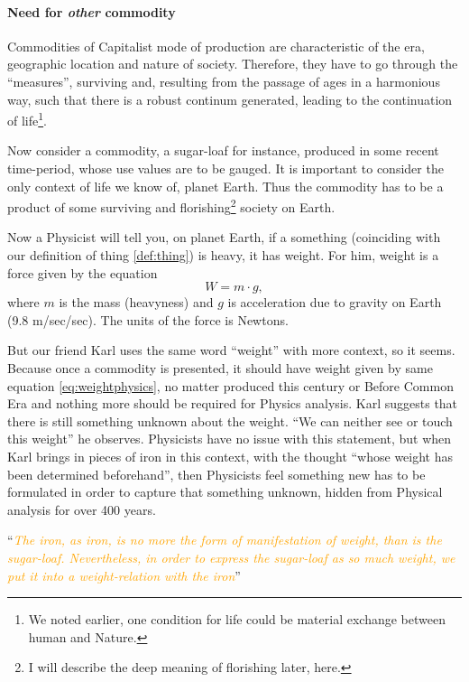 \documentclass[12pt]{extarticle}
\theoremstyle{definition}
\begin{document}
 \paragraph{Need for \emph{other} commodity}
 Commodities of Capitalist mode of production are characteristic of the era, geographic location and nature of society.  Therefore, they have to go through the ``measures'', surviving and, resulting from the passage of ages in a harmonious way, such that there is a robust continum generated, leading to the continuation of life\footnote{We noted earlier, one condition for life could be material exchange between human and Nature.}.

 Now consider a commodity, a sugar-loaf for instance, produced in some recent time-period, whose use values are to be gauged.  It is important to consider the only context of life we know of, planet Earth.  Thus the commodity has to be a product of some surviving and florishing\footnote{I will describe the deep meaning of florishing later, here.} society on Earth.

 Now a Physicist will tell you, on planet Earth, if a something (coinciding with our definition of thing \ref{def:thing}) is heavy, it has weight.  For him, weight is a force given by the equation
 \begin{equation}
   \label{eq:weightphysics}
   W = m\cdot g,
 \end{equation}
 where $m$ is the mass (heavyness) and $g$ is acceleration due to gravity on Earth (9.8 m/sec/sec).  The units of the force is Newtons.

 But our friend Karl uses the same word ``weight'' with more context, so it seems.  Because once a commodity is presented, it should have weight given by same equation \ref{eq:weightphysics}, no matter produced this century or Before Common Era and nothing more should be required for Physics analysis.  Karl suggests that there is still something unknown about the weight.  ``We can neither see or touch this weight'' he observes.  Physicists have no issue with this statement, but when Karl brings in pieces of iron in this context, with the thought ``whose weight has been determined beforehand'', then Physicists feel something new has to be formulated in order to capture that something unknown, hidden from Physical analysis for over 400 years.

 ``\emph{\textcolor{orange}{The iron, as iron, is no more the form of manifestation of weight, than is the sugar-loaf. Nevertheless, in order to express the sugar-loaf as so much weight, we put it into a weight-relation with the iron}}''
\end{document}
